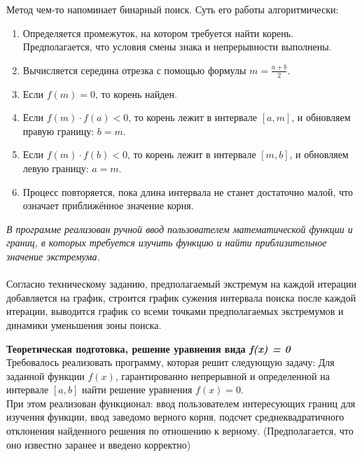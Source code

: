 Метод чем-то напоминает бинарный поиск. Суть его работы алгоритмически:
\begin{enumerate}
    \item Определяется промежуток, на котором требуется найти корень. Предполагается, что условия смены знака и непрерывности выполнены.
    \item Вычисляется середина отрезка с помощью формулы \( m = \frac{a + b}{2} \). 
    \item Если \( f(m) = 0 \), то корень найден. 
    \item Если \( f(m) \cdot f(a) < 0 \), то корень лежит в интервале \([a, m]\), и обновляем правую границу: \(b = m\).
    \item Если \( f(m) \cdot f(b) < 0 \), то корень лежит в интервале \([m, b]\), и обновляем левую границу: \(a = m\).
    \item Процесс повторяется, пока длина интервала не станет достаточно малой, что означает приближённое значение корня.
\end{enumerate}
\textit{В программе реализован ручной ввод пользователем математической функции и границ, в которых требуется изучить функцию и найти приблизительное значение экстремума.} \\
\\
Согласно техническому заданию, предполагаемый экстремум на каждой итерации добавляется на график,
строится график сужения интервала поиска после каждой итерации, выводится график со всеми точками
предполагаемых экстремумов и динамики уменьшения зоны поиска.
\vspace{1cm}

\textbf{Теоретическая подготовка, решение уравнения вида \textit{f(x) = 0}}\\ 
Требовалось реализовать программу, которая решит следующую задачу:
Для заданной функции $f(x)$, гарантированно непрерывной и определенной на интервале
$[a,b]$ найти решение уравнения $f(x) = 0$.\\
При этом реализован функционал:
ввод пользователем интересующих границ для изучения функции, ввод заведомо верного корня,
подсчет среднеквадратичного отклонения найденного решения по отношению к верному. (Предполагается,
что оно известно заранее и введено корректно)
